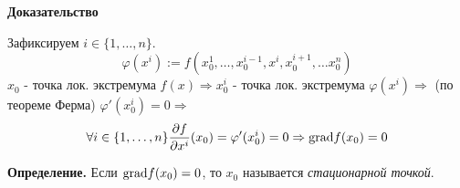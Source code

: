 \documentclass{article}
\begin{document}
 \textbf{Доказательство}
 
 Зафиксируем $i \in \{1, \dots, n \}$.
 \[\varphi(x^i) := f(x_0^1, \dots, x_0^{i-1}, x^i, x_0^{i+1}, \dots x_0^n)\]
$x_0$ - точка лок. экстремума $f(x) \Rightarrow x_0^i$ - точка лок. экстремума $\varphi(x^i) \Rightarrow$ (по теореме Ферма) $\varphi'(x^i_0) = 0 \Rightarrow$
\[\forall i \in \{1, \dots, n \} \frac{\partial f} {\partial x^i}( x_0) =\varphi'(x_0^i) = 0 \Rightarrow \textnormal{grad} f(x_0) = 0\]

\textbf{Определение.} Если $\textnormal{grad} f(x_0) = 0$, то $x_0$ называется \emph{стационарной точкой}.
\end{document}
